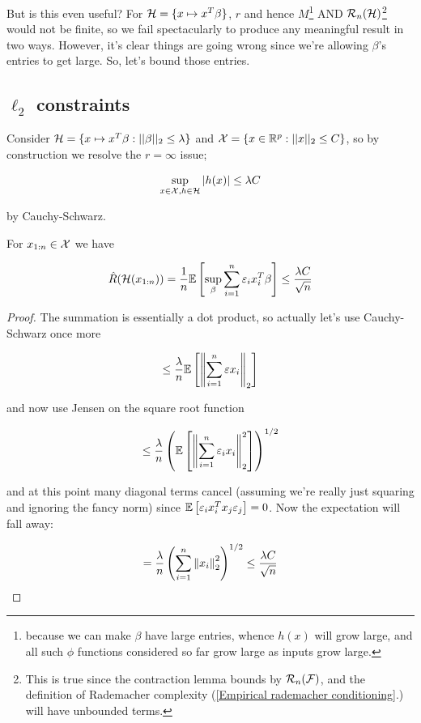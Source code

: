 \documentclass[11pt]{scrartcl}
\begin{document}
But is this even useful? For $\mathcal{H} = \{ x \mapsto x^T \beta \}$, $r$ and hence $M$\footnote{because we can make $\beta$ have large entries, whence $h(x)$ will grow large, and all such $\phi$ functions considered so far grow large as inputs grow large.} AND $\mathcal{R}_n(\mathcal{H})$\footnote{This is true since the contraction lemma bounds by $\mathcal{R}_n(\mathcal{F})$, and the definition of Rademacher complexity (\ref{Empirical rademacher conditioning}.) will have unbounded terms.} would not be finite, so we fail spectacularly to produce any meaningful result in two ways. However, it's clear things are going wrong since we're allowing $\beta$'s entries to get large. So, let's bound those entries.

\subsection{$\ell_2$ constraints}

Consider $\mathcal{H} = \{ x \mapsto x^T \beta : ||\beta||_2 \le \lambda \}$ and $\mathcal{X} = \{ x \in \mathbb R^p : ||x||_2 \le C \}$, so by construction we resolve the $r=\infty$ issue; 

\begin{equation}
    \sup_{x \in \mathcal{X}, h \in \mathcal{H}} |h(x)| \le \lambda C 
\end{equation}

by Cauchy-Schwarz.

\begin{theorem}
\label{L2 constrained rademacher bound}
For $x_{1:n} \in \mathcal{X}$ we have 

\begin{equation}
\hat{R}(\mathcal{H}(x_{1:n})) = \frac1n \mathbb{E} \left[  \sup_\beta \sum_{i=1}^n \varepsilon_i x_i^T \beta  \right] \le \frac{\lambda C}{\sqrt{n}}
\end{equation}

\begin{proof}
The summation is essentially a dot product, so actually let's use Cauchy-Schwarz once more

\begin{equation}
    \le \frac{\lambda}{n} \mathbb{E} \left[  \left\lVert \sum_{i=1}^n \varepsilon x_i \right\rVert_2  \right]
\end{equation}

and now use Jensen on the square root function

\begin{equation}
    \le \frac{\lambda}{n} \left( \mathbb{E} \left[  \left\lVert \sum_{i=1}^n \varepsilon_i x_i \right\rVert_2^2  \right] \right)^{1/2}
\end{equation}

and at this point many diagonal terms cancel (assuming we're really just squaring and ignoring the fancy norm) since $\mathbb{E} \left[ \varepsilon_i x_i^T x_j \varepsilon_j \right] = 0$. Now the expectation will fall away:

\begin{equation}
    = \frac{\lambda}{n} \left( \sum_{i=1}^n \left\lVert x_i\right\rVert_2^2 \right)^{1/2} \le \frac{ \lambda C }{\sqrt{n}}
\end{equation}
\end{proof}
\end{theorem}
\end{document}

